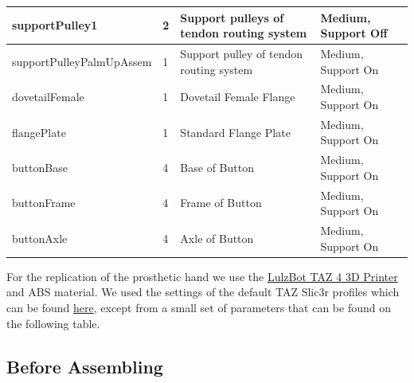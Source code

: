 \begin{table}[h!]
{\begin{tabular}{ | l | l | l | l | }
			supportPulley1 & 2 & Support pulleys of tendon routing system & Medium, Support Off \\ \hline
			supportPulleyPalmUpAssem & 1 & Support pulley of tendon routing system & Medium, Support On \\ \hline  	
			dovetailFemale & 1 & Dovetail Female Flange & Medium, Support On \\ \hline
			flangePlate & 1 & Standard Flange Plate & Medium, Support On \\ \hline
			buttonBase & 4 & Base of Button & Medium, Support On \\ \hline    	
			buttonFrame & 4 & Frame of Button & Medium, Support On \\ \hline 
			buttonAxle & 4 & Axle of Button & Medium, Support On \\ \hline
		\end{tabular}
	}
\end{table}

\vspace{1cm}

For the replication of the prosthetic hand we use the \href{https://download.lulzbot.com/TAZ/4.0/documentation/2014Q2/manual/TAZ_4_Manual.pdf}{LulzBot TAZ 4 3D Printer} and ABS material. We used the settings of the default TAZ Slic3r profiles which can be found \href{https://www.lulzbot.com/support/taz-slic3r-profiles}{here}, except from a small set of parameters that can be found on the following table.

\vspace{1cm}

\begin{table}[h!]
	\centering
\end{table}

\newpage

\subsection{Before Assembling}

